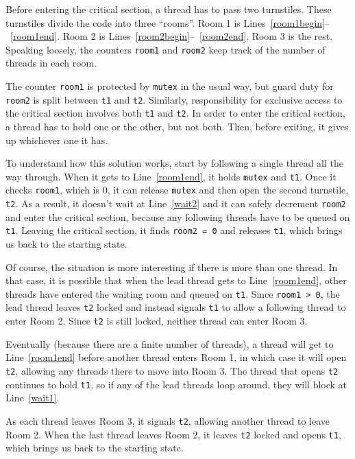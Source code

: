 Before entering the critical section, a thread has to pass two
turnstiles.  These turnstiles divide the code into three ``rooms''.
Room 1 is Lines~\ref{room1begin}--~\ref{room1end}.  Room 2 is
Lines~\ref{room2begin}--~\ref{room2end}.  Room 3 is the rest.
Speaking loosely, the counters {\tt room1} and {\tt room2} keep track
of the number of threads in each room.

The counter {\tt room1} is protected by {\tt mutex} in the usual way,
but guard duty for {\tt room2} is split between {\tt t1} and {\tt t2}.
Similarly, responsibility for exclusive access to the critical section
involves both {\tt t1} and {\tt t2}.  In order to enter the critical
section, a thread has to hold one or the other, but not both.  Then,
before exiting, it gives up whichever one it has.

To understand how this solution works, start by following a single
thread all the way through.  When it gets to Line~\ref{room1end}, it
holds {\tt mutex} and {\tt t1}.  Once it checks {\tt room1}, which is
0, it can release {\tt mutex} and then open the second turnstile, {\tt
t2}.  As a result, it doesn't wait at Line~\ref{wait2} and it can
safely decrement {\tt room2} and enter the critical section, because
any following threads have to be queued on {\tt t1}.  Leaving the
critical section, it finds {\tt room2 = 0} and releases {\tt t1},
which brings us back to the starting state.

Of course, the situation is more interesting if there is more than one
thread.  In that case, it is possible that when the lead thread gets
to Line~\ref{room1end}, other threads have entered the waiting room
and queued on {\tt t1}.  Since {\tt room1 > 0}, the lead thread leaves
{\tt t2} locked and instead signals {\tt t1} to allow a following
thread to enter Room 2.  Since {\tt t2} is still locked, neither
thread can enter Room 3.

Eventually (because there are a finite number of threads), a thread
will get to Line~\ref{room1end} before another thread enters Room 1, in which
case it will open {\tt t2}, allowing any threads there to move into
Room 3.  The thread that opens {\tt t2} continues to hold {\tt t1}, so
if any of the lead threads loop around, they will block at Line~\ref{wait1}.

As each thread leaves Room 3, it signals {\tt t2}, allowing another
thread to leave Room 2.  When the last thread leaves Room 2, it leaves
{\tt t2} locked and opens {\tt t1}, which brings us back to the
starting state.

